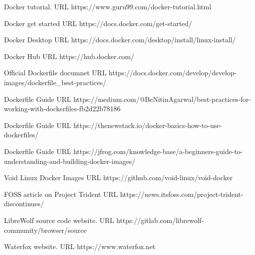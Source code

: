 \documentclass{article}  %
\begin{document}
\begin{thebibliography}{99}

Docker tutorial.
URL https://www.guru99.com/docker-tutorial.html

Docker get started 
URL https://docs.docker.com/get-started/

Docker Desktop
URL https://docs.docker.com/desktop/install/linux-install/

Docker Hub
URL https://hub.docker.com/

Official Dockerfile documnet
URL https://docs.docker.com/develop/develop-images/dockerfile\_best-practices/

Dockerfile Guide
URL https://medium.com/@BeNitinAgarwal/best-practices-for-working-with-dockerfiles-fb2d22b78186

Dockerfile Guide
URL https://thenewstack.io/docker-basics-how-to-use-dockerfiles/

Dockerfile Guide
URL https://jfrog.com/knowledge-base/a-beginners-guide-to-understanding-and-building-docker-images/

Void Linux Docker Images
URL https://github.com/void-linux/void-docker

FOSS article on Project Trident
URL https://news.itsfoss.com/project-trident-discontinues/


LibreWolf source code website.
URL https://gitlab.com/librewolf-community/browser/source


Waterfox website. URL https://www.waterfox.net


\end{thebibliography}
\end{document}
